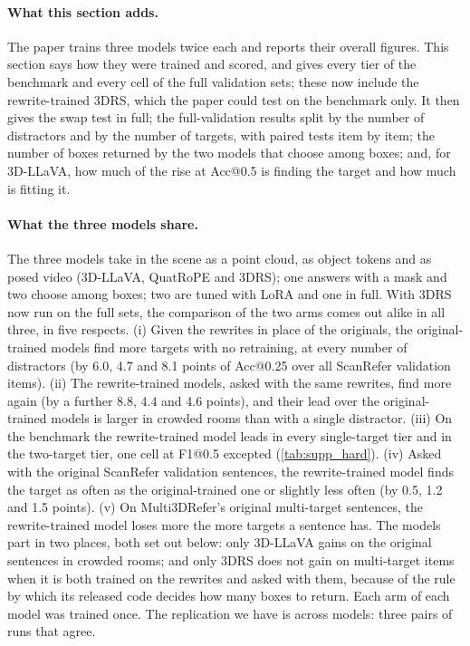 \paragraph{What this section adds.}
The paper trains three models twice each and reports their overall figures.
This section says how they were trained and scored, and gives every tier of the benchmark and every cell of the full validation sets; these now include the rewrite-trained 3DRS, which the paper could test on the benchmark only.
It then gives the swap test in full; the full-validation results split by the number of distractors and by the number of targets, with paired tests item by item; the number of boxes returned by the two models that choose among boxes; and, for 3D-LLaVA, how much of the rise at Acc@0.5 is finding the target and how much is fitting it.

\paragraph{What the three models share.}
The three models take in the scene as a point cloud, as object tokens and as posed video (3D-LLaVA, QuatRoPE and 3DRS); one answers with a mask and two choose among boxes; two are tuned with LoRA and one in full.
With 3DRS now run on the full sets, the comparison of the two arms comes out alike in all three, in five respects.
(i) Given the rewrites in place of the originals, the original-trained models find more targets with no retraining, at every number of distractors (by 6.0, 4.7 and 8.1 points of Acc@0.25 over all ScanRefer validation items).
(ii) The rewrite-trained models, asked with the same rewrites, find more again (by a further 8.8, 4.4 and 4.6 points), and their lead over the original-trained models is larger in crowded rooms than with a single distractor.
(iii) On the benchmark the rewrite-trained model leads in every single-target tier and in the two-target tier, one cell at F1@0.5 excepted (\cref{tab:supp_hard}).
(iv) Asked with the original ScanRefer validation sentences, the rewrite-trained model finds the target as often as the original-trained one or slightly less often (by 0.5, 1.2 and 1.5 points).
(v) On Multi3DRefer's original multi-target sentences, the rewrite-trained model loses more the more targets a sentence has.
The models part in two places, both set out below: only 3D-LLaVA gains on the original sentences in crowded rooms; and only 3DRS does not gain on multi-target items when it is both trained on the rewrites and asked with them, because of the rule by which its released code decides how many boxes to return.
Each arm of each model was trained once. The replication we have is across models: three pairs of runs that agree.

